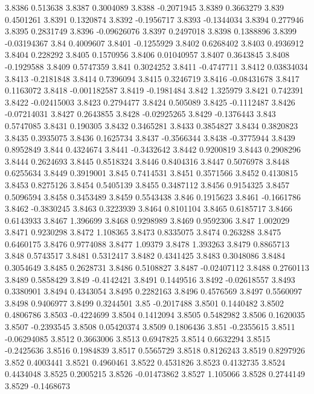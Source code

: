 3.8386  0.513638
3.8387  0.3004089
3.8388  -0.2071945
3.8389  0.3663279
3.839  0.4501261
3.8391  0.1320874
3.8392  -0.1956717
3.8393  -0.1344034
3.8394  0.277946
3.8395  0.2831749
3.8396  -0.09626076
3.8397  0.2497018
3.8398  0.1388896
3.8399  -0.03194367
3.84  0.4009607
3.8401  -0.1255929
3.8402  0.6268402
3.8403  0.4936912
3.8404  0.228292
3.8405  0.1570956
3.8406  0.01040957
3.8407  0.3643845
3.8408  -0.1929588
3.8409  0.5747359
3.841  0.3024252
3.8411  -0.4747711
3.8412  0.03834034
3.8413  -0.2181848
3.8414  0.7396094
3.8415  0.3246719
3.8416  -0.08431678
3.8417  0.1163072
3.8418  -0.001182587
3.8419  -0.1981484
3.842  1.325979
3.8421  0.742391
3.8422  -0.02415003
3.8423  0.2794477
3.8424  0.505089
3.8425  -0.1112487
3.8426  -0.07214031
3.8427  0.2643855
3.8428  -0.02925265
3.8429  -0.1376443
3.843  0.5747085
3.8431  0.190305
3.8432  0.3465281
3.8433  0.3854827
3.8434  0.3820823
3.8435  0.3935075
3.8436  0.1625734
3.8437  -0.3566344
3.8438  -0.3775944
3.8439  0.8952849
3.844  0.4324674
3.8441  -0.3432642
3.8442  0.9200819
3.8443  0.2908296
3.8444  0.2624693
3.8445  0.8518324
3.8446  0.8404316
3.8447  0.5076978
3.8448  0.6255634
3.8449  0.3919001
3.845  0.7414531
3.8451  0.3571566
3.8452  0.4130815
3.8453  0.8275126
3.8454  0.5405139
3.8455  0.3487112
3.8456  0.9154325
3.8457  0.5096594
3.8458  0.3453489
3.8459  0.5543438
3.846  0.1915623
3.8461  -0.1661786
3.8462  -0.3830245
3.8463  0.3223939
3.8464  0.8101104
3.8465  0.6185717
3.8466  0.6143933
3.8467  1.396699
3.8468  0.9298989
3.8469  0.9592306
3.847  1.002029
3.8471  0.9230298
3.8472  1.108365
3.8473  0.8335075
3.8474  0.263288
3.8475  0.6460175
3.8476  0.9774088
3.8477  1.09379
3.8478  1.393263
3.8479  0.8865713
3.848  0.5743517
3.8481  0.5312417
3.8482  0.4341425
3.8483  0.3048086
3.8484  0.3054649
3.8485  0.2628731
3.8486  0.5108827
3.8487  -0.02407112
3.8488  0.2760113
3.8489  0.5858429
3.849  -0.4142421
3.8491  0.1449516
3.8492  -0.02618557
3.8493  0.3380901
3.8494  0.4343054
3.8495  0.2282163
3.8496  0.4576569
3.8497  0.5560097
3.8498  0.9406977
3.8499  0.3244501
3.85  -0.2017488
3.8501  0.1440482
3.8502  0.4806786
3.8503  -0.4224699
3.8504  0.1412094
3.8505  0.5482982
3.8506  0.1620035
3.8507  -0.2393545
3.8508  0.05420374
3.8509  0.1806436
3.851  -0.2355615
3.8511  -0.06294085
3.8512  0.3663006
3.8513  0.6947825
3.8514  0.6632294
3.8515  -0.2425636
3.8516  0.1984839
3.8517  0.5565729
3.8518  0.8126243
3.8519  0.8297926
3.852  0.4003441
3.8521  0.4960461
3.8522  0.4531826
3.8523  0.4132735
3.8524  0.4434048
3.8525  0.2005215
3.8526  -0.01473862
3.8527  1.105066
3.8528  0.2744149
3.8529  -0.1468673
